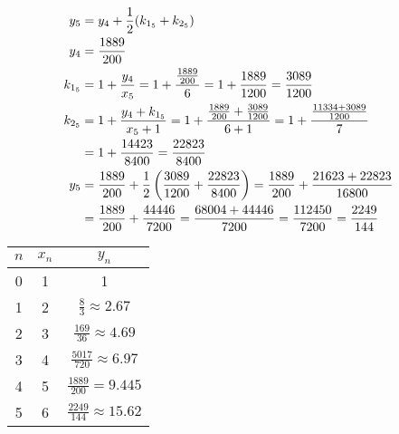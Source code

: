 	\begin{align}
		y_{5} &= y_{4} + \frac{1}{2}(k_{1_{5}}+k_{2_{5}})& \\
		y_{4} &= \frac{1889}{200}& \\
		k_{1_{5}} &= 1 + \frac{y_{4}}{x_{5}} = 1 + \frac{\frac{1889}{200}}{6} = 1 + \frac{1889}{1200} = \frac{3089}{1200}& \\
		k_{2_{5}} &= 1 + \frac{y_{4} + k_{1_{5}}}{x_{5} + 1} = 1 + \frac{\frac{1889}{200} + \frac{3089}{1200}}{6 + 1} = 1 + \frac{\frac{11334+3089}{1200}}{7}& \notag \\
		&= 1 + \frac{14423}{8400} = \frac{22823}{8400}& \\
		y_{5} &= \frac{1889}{200} + \frac{1}{2}\left(\frac{3089}{1200}+\frac{22823}{8400}\right) = \frac{1889}{200} + \frac{21623 + 22823}{16800}& \notag \\
		&= \frac{1889}{200} + \frac{44446}{7200} = \frac{68004 + 44446}{7200} = \frac{112450}{7200} = \frac{2249}{144}&
	\end{align}

	\renewcommand{\arraystretch}{1.5}
	\begin{table}[H]
		\centering
		\begin{tabular}{|c|c|c|}
			\hline
			$n$ & $x_{n}$ & $y_{n}$ \\[0.5em] \hline
			0 & 1 & 1 \\[0.5em] \hline
			1 & 2 & $\frac{8}{3} \approx 2.67$ \\[0.5em] \hline
			2 & 3 & $\frac{169}{36} \approx 4.69$ \\[0.5em] \hline
			3 & 4 & $\frac{5017}{720} \approx 6.97$ \\[0.5em] \hline
			4 & 5 & $\frac{1889}{200} = 9.445$ \\[0.5em] \hline
			5 & 6 & $\frac{2249}{144} \approx 15.62$ \\[0.5em] \hline
		\end{tabular}
	\end{table}
